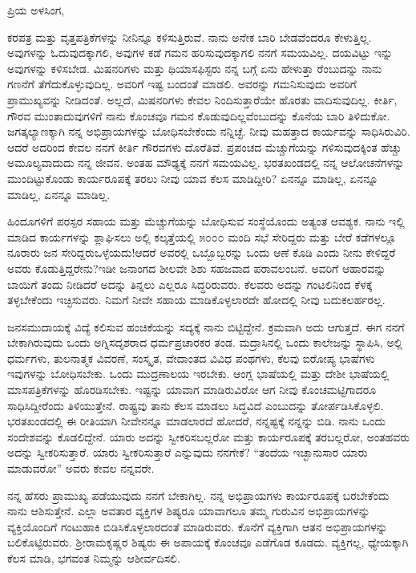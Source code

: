 \noindent
ಪ್ರಿಯ ಅಳಸಿಂಗ,

ಕರಪತ್ರ ಮತ್ತು ವೃತ್ತಪತ್ರಿಕೆಗಳನ್ನು ನೀನಿನ್ನೂ ಕಳಿಸುತ್ತಿರುವೆ. ನಾನು ಅನೇಕ ಬಾರಿ ಬೇಡವೆಂದರೂ ಕೇಳುತ್ತಿಲ್ಲ. ಅವುಗಳನ್ನು ಓದುವುದಕ್ಕಾಗಲಿ, ಅವುಗಳ ಕಡೆ ಗಮನ ಹರಿಸುವುದಕ್ಕಾಗಲಿ ನನಗೆ ಸಮಯವಿಲ್ಲ. ದಯವಿಟ್ಟು ಇನ್ನು ಅವುಗಳನ್ನು ಕಳಿಸಬೇಡ. ಮಿಷನರಿಗಳು ಮತ್ತು ಥಿಯಾಸಫಿಸ್ಟರು ನನ್ನ ಬಗ್ಗೆ ಏನು ಹೇಳುತ್ತಾ ರೆಂಬುದನ್ನು ನಾನು ಗಣನೆಗೆ ತೆಗೆದುಕೊಳ್ಳುವುದಿಲ್ಲ. ಅವರಿಗೆ ಇಷ್ಟ ಬಂದಂತೆ ಮಾಡಲಿ. ಅವರನ್ನು ಗಮನಿಸುವುದು ಅವರಿಗೆ ಪ್ರಾಮುಖ್ಯವನ್ನು ನೀಡಿದಂತೆ. ಅಲ್ಲದೆ, ಮಿಷನರಿಗಳು ಕೇವಲ ನಿಂದಿಸುತ್ತಾರೆಯೇ ಹೊರತು ವಾದಿಸುವುದಿಲ್ಲ. ಕೀರ್ತಿ, ಗೌರವ ಮುಂತಾದುವುಗಳಿಗೆ ನಾನು ಕೊಂಚವೂ ಗಮನ ಕೊಡುವುದಿಲ್ಲವೆಂಬುದನ್ನು ಕೊನೆಯ ಬಾರಿ ತಿಳಿದುಕೋ. ಜಗತ್ಕಲ್ಯಾಣಕ್ಕಾಗಿ ನನ್ನ ಅಭಿಪ್ರಾಯಗಳನ್ನು ಬೋಧಿಸಬೇಕೆಂದು ನನ್ನಿಚ್ಛೆ. ನೀವು ಮಹತ್ತಾದ ಕಾರ್ಯವನ್ನು ಸಾಧಿಸಿರುವಿರಿ. ಆದರೆ ಅದರಿಂದ ಕೇವಲ ನನಗೆ ಕೀರ್ತಿ ಗೌರವಗಳು ದೊರೆತಿವೆ. ಪ್ರಪಂಚದ ಮೆಚ್ಚುಗೆಯನ್ನು ಗಳಿಸುವುದಕ್ಕಿಂತ ಹೆಚ್ಚು ಅಮೂಲ್ಯವಾದುದು ನನ್ನ ಜೀವನ. ಅಂತಹ ಮೌಢ್ಯಕ್ಕೆ ನನಗೆ ಸಮಯವಿಲ್ಲ. ಭರತಖಂಡದಲ್ಲಿ ನನ್ನ ಆಲೋಚನೆಗಳನ್ನು ಮುಂದಿಟ್ಟುಕೊಂಡು ಕಾರ್ಯರೂಪಕ್ಕೆ ತರಲು ನೀವು ಯಾವ ಕೆಲಸ ಮಾಡಿದ್ದೀರಿ? ಏನನ್ನೂ ಮಾಡಿಲ್ಲ, ಏನನ್ನೂ ಮಾಡಿಲ್ಲ, ಏನನ್ನೂ ಮಾಡಿಲ್ಲ.

ಹಿಂದೂಗಳಿಗೆ ಪರಸ್ಪರ ಸಹಾಯ ಮತ್ತು ಮೆಚ್ಚುಗೆಯನ್ನು ಬೋಧಿಸುವ ಸಂಸ್ಥೆಯೊಂದು ಅತ್ಯಂತ ಆವಶ್ಯಕ. ನಾನು ಇಲ್ಲಿ ಮಾಡಿದ ಕಾರ್ಯಗಳನ್ನು ಶ್ಲಾಘಿಸಲು ಅಲ್ಲಿ ಕಲ್ಕತ್ತೆಯಲ್ಲಿ ೫೦೦೦ ಮಂದಿ ಸಭೆ ಸೇರಿದ್ದರು ಮತ್ತು ಬೇರೆ ಕಡೆಗಳಲ್ಲೂ ನೂರಾರು ಜನ ಸೇರಿದ್ದರು\enginline{-}ಒಳ್ಳೆಯದು!ಆದರೆ ಅವರಲ್ಲಿ ಒಬ್ಬೊಬ್ಬರನ್ನು ಒಂದು ಆಣೆ ಕೊಡಿ ಎಂದು ನೀನು ಕೇಳಿದ್ದರೆ ಅವರು ಕೊಡುತ್ತಿದ್ದರೇನು?ಇಡೀ ಜನಾಂಗದ ಶೀಲವೇ ಶಿಶು ಸಹಜವಾದ ಪರಾವಲಂಬನೆ. ಅವರಿಗೆ ಆಹಾರವನ್ನು ಬಾಯಿಗೆ ತಂದು ನೀಡಿದರೆ ಅದನ್ನು ತಿನ್ನಲು ಎಲ್ಲರೂ ಸಿದ್ಧರಿರುವರು. ಕೆಲವರು ಅದನ್ನು ಗಂಟಲಿನಿಂದ ಕೆಳಕ್ಕೆ ತಳ್ಳಬೇಕೆಂದು ಇಚ್ಛಿಸುವರು. ನಿಮಗೆ ನೀವೇ ಸಹಾಯ ಮಾಡಿಕೊಳ್ಳಲಾರದೇ ಹೋದಲ್ಲಿ ನೀವು ಬದುಕಲರ್ಹರಲ್ಲ.

ಜನಸಮುದಾಯಕ್ಕೆ ವಿದ್ಯೆ ಕಲಿಸುವ ಹಂಚಿಕೆಯನ್ನು ಸದ್ಯಕ್ಕೆ ನಾನು ಬಿಟ್ಟಿದ್ದೇನೆ. ಕ್ರಮವಾಗಿ ಅದು ಆಗುತ್ತದೆ. ಈಗ ನನಗೆ ಬೇಕಾಗಿರುವುದು ಒಂದು ಅಗ್ನಿಸದೃಶರಾದ ಧರ್ಮಪ್ರಚಾರಕರ ತಂಡ. ಮದ್ರಾಸಿನಲ್ಲಿ ಒಂದು ಕಾಲೇಜನ್ನು ಸ್ಥಾಪಿಸಿ, ಅಲ್ಲಿ ಧರ್ಮಗಳು, ತುಲನಾತ್ಮಕ ವಿವರಣೆ, ಸಂಸ್ಕೃತ, ವೇದಾಂತದ ವಿವಿಧ ಪಂಥಗಳು, ಕೆಲವು ಐರೋಪ್ಯ ಭಾಷೆಗಳು ಇವುಗಳನ್ನು ಬೋಧಿಸಬೇಕು. ಒಂದು ಮುದ್ರಣಾಲಯ ಇರಬೇಕು. ಆಂಗ್ಲ ಭಾಷೆಯಲ್ಲಿ ಮತ್ತು ದೇಶೀ ಭಾಷೆಯಲ್ಲಿ ಮಾಸಪತ್ರಿಕೆಗಳನ್ನು ಹೊರಡಿಸಬೇಕು. ಇಷ್ಟನ್ನು ಯಾವಾಗ ಮಾಡಿರುವಿರೋ ಆಗ ನೀವು ಕೊಂಚಮಟ್ಟಿಗಾದರೂ ಸಾಧಿಸಿದ್ದೀರೆಂದು ತಿಳಿಯುತ್ತೇನೆ. ರಾಷ್ಟ್ರವು ತಾನು ಕೆಲಸ ಮಾಡಲು ಸಿದ್ಧವಿದೆ ಎಂಬುದನ್ನು ತೋರ್ಪಡಿಸಿಕೊಳ್ಳಲಿ. ಭರತಖಂಡದಲ್ಲಿ ಈ ರೀತಿಯಾಗಿ ನೀವೇನನ್ನೂ ಮಾಡಲಾರದೆ ಹೋದರೆ, ನನ್ನಷ್ಟಕ್ಕೆ ನನ್ನನ್ನು ಬಿಡಿ. ನಾನು ಒಂದು ಸಂದೇಶವನ್ನು ಕೊಡಲಿದ್ದೇನೆ. ಯಾರು ಅದನ್ನು ಸ್ವೀಕರಿಸಬಲ್ಲರೋ ಮತ್ತು ಕಾರ್ಯರೂಪಕ್ಕೆ ತರಬಲ್ಲರೋ, ಅಂತಹವರು ಅದನ್ನು ಸ್ವೀಕರಿಸುತ್ತಾರೆ. ಯಾರು ಸ್ವೀಕರಿಸುತ್ತಾರೆ ಎನ್ನುವುದು ನನಗೇಕೆ? “ತಂದೆಯ ಇಚ್ಛಾನುಸಾರ ಯಾರು ಮಾಡುವರೋ” ಅವರು ಕೇವಲ ನನ್ನವರೇ.

ನನ್ನ ಹೆಸರು ಪ್ರಾಮುಖ್ಯ ಪಡೆಯುವುದು ನನಗೆ ಬೇಕಾಗಿಲ್ಲ. ನನ್ನ ಅಭಿಪ್ರಾಯಗಳು ಕಾರ್ಯರೂಪಕ್ಕೆ ಬರಬೇಕೆಂದು ನಾನು ಆಶಿಸುತ್ತೇನೆ. ಎಲ್ಲಾ ಅವತಾರ ವ್ಯಕ್ತಿಗಳ ಶಿಷ್ಯರೂ ಯಾವಾಗಲೂ ತಮ್ಮ ಗುರುವಿನ ಅಭಿಪ್ರಾಯಗಳನ್ನು ವ್ಯಕ್ತಿಯೊಂದಿಗೆ ಗಂಟುಹಾಕಿ ಬಿಡಿಸಿಕೊಳ್ಳಲಾರದಂತೆ ಮಾಡಿರುವರು. ಕೊನೆಗೆ ವ್ಯಕ್ತಿಗಾಗಿ ಆತನ ಅಭಿಪ್ರಾಯಗಳನ್ನು ಬಲಿಕೊಟ್ಟಿರುವರು. ಶ‍್ರೀರಾಮಕೃಷ್ಣರ ಶಿಷ್ಯರು ಈ ಅಪಾಯಕ್ಕೆ ಕೊಂಚವೂ ಎಡೆಗೊಡ ಕೂಡದು. ವ್ಯಕ್ತಿಗಲ್ಲ, ಧ್ಯೇಯಕ್ಕಾಗಿ ಕೆಲಸ ಮಾಡಿ, ಭಗವಂತ ನಿಮ್ಮನ್ನು ಆಶೀರ್ವದಿಸಲಿ.
\vspace{-0.5cm}

